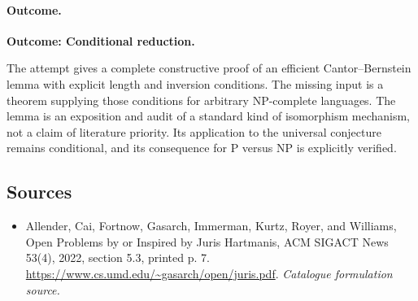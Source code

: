 \documentclass[11pt,a4paper]{article}
\numberwithin{equation}{section}
\begin{document}
\paragraph{Outcome.}
\textbf{Outcome: Conditional reduction.}

The attempt gives a complete constructive proof of an efficient
Cantor--Bernstein lemma with explicit length and inversion conditions.
The missing input is a theorem supplying those conditions for arbitrary
NP-complete languages. The lemma is an exposition and audit of a standard
kind of isomorphism mechanism, not a claim of literature priority. Its
application to the universal conjecture remains conditional, and its
consequence for $\mathrm P$ versus $\mathrm{NP}$ is explicitly verified.
\subsection{Sources}
\begin{itemize}\raggedright
\item[\textnormal{[S1]}]\hypertarget{source:statement:1}{} Allender, Cai, Fortnow, Gasarch, Immerman, Kurtz, Royer, and Williams, Open Problems by or Inspired by Juris Hartmanis, ACM SIGACT News 53(4), 2022, section 5.3, printed p. 7.
\url{https://www.cs.umd.edu/~gasarch/open/juris.pdf}.
{\small\textit{Catalogue formulation source.}}
\end{itemize}
\end{document}
